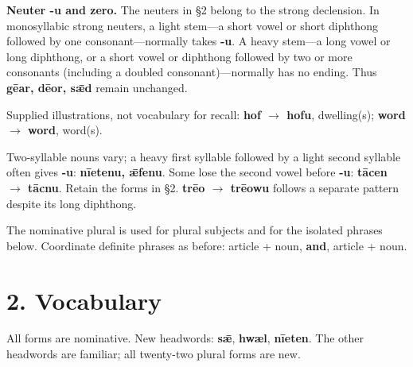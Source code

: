 \textbf{Neuter -u and zero.} The neuters in §2 belong to the strong declension. In monosyllabic strong neuters, a light stem—a short vowel or short diphthong followed by one consonant—normally takes \textbf{-u}. A heavy stem—a long vowel or long diphthong, or a short vowel or diphthong followed by two or more consonants (including a doubled consonant)—normally has no ending. Thus \textbf{gēar, dēor, sǣd} remain unchanged.


Supplied illustrations, not vocabulary for recall: \textbf{hof \ensuremath{\rightarrow} hofu}, dwelling(s); \textbf{word \ensuremath{\rightarrow} word}, word(s).

Two-syllable nouns vary; a heavy first syllable followed by a light second syllable often gives \textbf{-u}: \textbf{nīetenu, ǣfenu}. Some lose the second vowel before \textbf{-u}: \textbf{tācen \ensuremath{\rightarrow} tācnu}. Retain the forms in §2. \textbf{trēo \ensuremath{\rightarrow} trēowu} follows a separate pattern despite its long diphthong.

The nominative plural is used for plural subjects and for the isolated phrases below. Coordinate definite phrases as before: article + noun, \textbf{and}, article + noun.


\clearpage
{}
\section*{2. Vocabulary}


All forms are nominative. New headwords: \textbf{sǣ}, \textbf{hwæl}, \textbf{nīeten}. The other headwords are familiar; all twenty-two plural forms are new.


